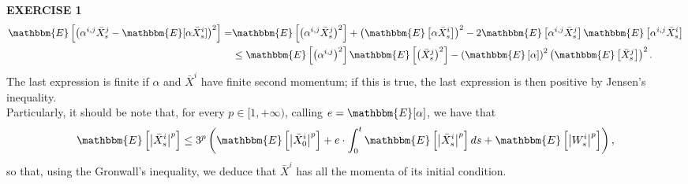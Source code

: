 \documentclass[11pt, a4paper]{article}
\begin{document}
\textbf{EXERCISE 1} \\
\[ \begin{aligned} \mathbbm{E} \left[ \left( \alpha^{i, j} \bar{X}^j_s - \mathbbm{E}[\alpha \bar{X}^i_s] \right)^2 \right] = &\mathbbm{E} \left[ \left( \alpha^{i, j} \bar{X}^j_s \right)^2 \right] + \left( \mathbbm{E} \left[ \alpha \bar{X}^i_s \right] \right)^2 - 2 \mathbbm{E} \left[ \alpha^{i, j} \bar{X}^j_s \right] \mathbbm{E} \left[ \alpha^{i, j} \bar{X}^i_s \right] \\ &\leq \mathbbm{E} \left[ \left( \alpha^{i, j} \right)^2 \right] \mathbbm{E} \left[ \left( \bar{X}^j_s \right)^2 \right] - \left( \mathbbm{E} \left[ \alpha \right] \right)^2 \left( \mathbbm{E} \left[ \bar{X}^j_s \right] \right)^2. \end{aligned} \] The last expression is finite if $\alpha$ and $\bar{X}^i$ have finite second momentum; if this is true, the last expression is then positive by Jensen's inequality. \\

Particularly, it should be note that, for every $p \in [1, +\infty)$, calling $e = \mathbbm{E}[\alpha]$, we have that \[ \mathbbm{E} \left[ \left| \bar{X}^i_s \right|^p \right] \leq 3^p \left( \mathbbm{E} \left[ \left| \bar{X}^i_0 \right|^p \right] + e \cdot \int_0^t \mathbbm{E} \left[ \left| \bar{X}^i_s \right|^p \right] ds + \mathbbm{E} \left[ \left| W^i_s \right|^p \right] \right), \] so that, using the Gronwall's inequality, we deduce that $\bar{X}^i$ has all the momenta of its initial condition. \\
\end{document}
